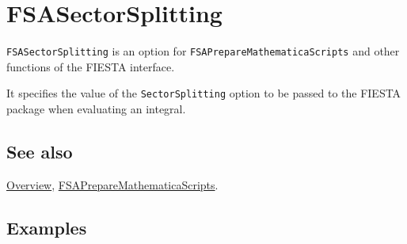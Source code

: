 \documentclass[../FeynHelpersManual.tex]{subfiles}
\begin{document}
\hypertarget{fsasectorsplitting}{
\section{FSASectorSplitting}\label{fsasectorsplitting}}

\texttt{FSASectorSplitting} is an option for
\texttt{FSAPrepareMathematicaScripts} and other functions of the FIESTA
interface.

It specifies the value of the \texttt{SectorSplitting} option to be
passed to the FIESTA package when evaluating an integral.

\subsection{See also}

\hyperlink{toc}{Overview},
\hyperlink{fsapreparemathematicascripts}{FSAPrepareMathematicaScripts}.

\subsection{Examples}
\end{document}
